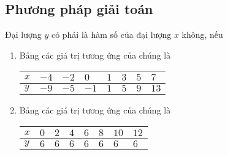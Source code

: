 \subsection{Phương pháp giải toán}
\begin{vd}%
Đại lượng $y$ có phải là hàm số của đại lượng $x$ không, nếu
\begin{enumerate}
\item Bảng các giá trị tương ứng của chúng là
\begin{center}
 \begin{tabular}{|>{\centering\arraybackslash}p{1.5cm}|>{\centering\arraybackslash}p{1cm}|>{\centering\arraybackslash}p{1cm}|>{\centering\arraybackslash}p{1cm}|>{\centering\arraybackslash}p{1cm}|>{\centering\arraybackslash}p{1cm}|>{\centering\arraybackslash}p{1cm}|>{\centering\arraybackslash}p{1cm}|}
\hline 
$x$ & $-4$ & $-2$ & $0$ & $1$ & $3$ & $5$ & $7$ \\ 
\hline 
$y$ & $-9$ & $-5$ & $-1$ & $1$ & $5$ & $9$ & $13$ \\ 
\hline 
\end{tabular}
 \end{center} 
\item Bảng các giá trị tương ứng của chúng là
\begin{center}
 \begin{tabular}{|>{\centering\arraybackslash}p{1.5cm}|>{\centering\arraybackslash}p{1cm}|>{\centering\arraybackslash}p{1cm}|>{\centering\arraybackslash}p{1cm}|>{\centering\arraybackslash}p{1cm}|>{\centering\arraybackslash}p{1cm}|>{\centering\arraybackslash}p{1cm}|>{\centering\arraybackslash}p{1cm}|}
\hline 
$x$ & $0$ & $2$ & $4$ & $6$ & $8$ & $10$ & $12$ \\ 
\hline 
$y$ & $6$ & $6$ & $6$ & $6$ & $6$ & $6$ & $6$ \\ 
\hline 
\end{tabular}
 \end{center} 
\end{enumerate}
\end{vd}
